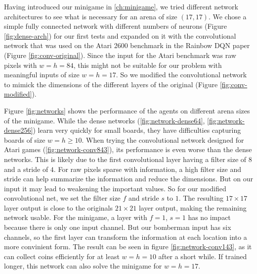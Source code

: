 
Having introduced our minigame in \ref{ch:minigame}, we tried different network architectures to see what is necessary for an arena of size $(17, 17)$.
We chose a simple fully connected network with different numbers of neurons (Figure \ref{fig:dense-arch}) for our first tests and expanded on it with the convolutional network that was used on the Atari 2600 benchmark in the Rainbow DQN paper\cite{Hessel2018RainbowCI} (Figure \ref{fig:conv-original}). Since the input for the Atari benchmark was raw pixels with $w=h=84$, this might not be suitable for our problem with meaningful inputs of size $w=h=17$. So we modified the convolutional network to mimick the dimensions of the different layers of the original (Figure \ref{fig:conv-modified}).

Figure \ref{fig:networks} shows the performance of the agents on different arena sizes of the minigame. While the dense networks (\ref{fig:network-dense64}, \ref{fig:network-dense256}) learn very quickly for small boards, they have difficulties capturing boards of size $w=h\geq10$. When trying the convolutional network designed for Atari games (\ref{fig:network-conv843}), its performance is even worse than the dense networks. This is likely due to the first convolutional layer having a filter size of $8$ and a stride of $4$. For raw pixels sparse with information, a high filter size and stride can help summarize the information and reduce the dimensions. But on our input it may lead to weakening the important values.
So for our modified convolutional net, we set the filter size $f$ and stride $s$ to $1$. The resulting $17\times17$ layer output is close to the originals $21\times21$ layer output, making the remaining network usable. For the minigame, a layer with $f=1$, $s=1$ has no impact because there is only one input channel. But our bomberman input has six channels, so the first layer can transform the information at each location into a more convinient form. The result can be seen in figure \ref{fig:network-conv143}, as it can collect coins efficiently for at least $w=h=10$ after a short while. If trained longer, this network can also solve the minigame for $w=h=17$.







